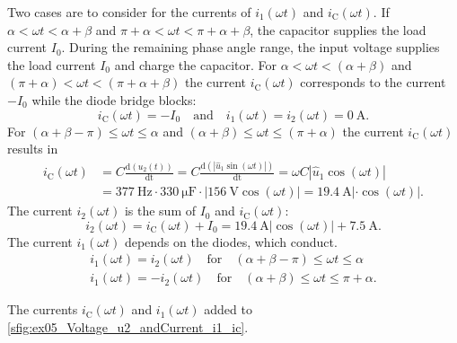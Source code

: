 \begin{solutionblock}
    Two cases are to consider for the currents of $i_\mathrm{1}(\omega t)$ and  $i_\mathrm{C}(\omega t)$. If $\alpha<\omega t<\alpha+\beta$
    and $\pi+\alpha<\omega t<\pi+\alpha+\beta$, the capacitor supplies the load current $I_{\mathrm{0}}$.
    During the remaining phase angle range, the input voltage supplies the load current $I_{\mathrm{0}}$ and charge the capacitor.
    For $\alpha<\omega t<(\alpha+\beta)$ and $(\pi+\alpha)<\omega t<(\pi+\alpha+\beta)$ the current $i_\mathrm{C}(\omega t)$ 
    corresponds to the current $-I_{\mathrm{0}}$ while the diode bridge blocks:
    \begin{equation} 
        i_\mathrm{C}(\omega t)=-I_{\mathrm{0}} \quad \text{and} \quad i_\mathrm{1}(\omega t)= i_\mathrm{2}(\omega t)= \SI{0}{\ampere}.
    \end{equation}
    For $(\alpha+\beta-\pi)\leq\omega t\leq\alpha$ and $(\alpha+\beta)\leq\omega t\leq(\pi+\alpha)$ the current $i_\mathrm{C}(\omega t)$ results in
    \begin{equation}
        \begin{aligned}
            i_\mathrm{C}(\omega t)&=C\frac{\mathrm{d}(u_\mathrm{2}(t))}{\mathrm{dt}}=C\frac{\mathrm{d}(\left| \hat{u}_\mathrm{1}\sin(\omega t)\right|)}{\mathrm{dt}}
            = \omega C \left|\hat{u}_\mathrm{1}\cos(\omega t)\right|  \\
            &= \SI{377}{\hertz} \cdot \SI{330}{\micro\farad} \cdot  \left|\SI{156}{\volt}\cos(\omega t)\right|
            =\SI{19.4}{\ampere}\left| \cdot \cos(\omega t)\right|.
        \end{aligned}
    \end{equation}
    The current $i_\mathrm{2}(\omega t)$ is the sum of $I_{\mathrm{0}}$ and $i_\mathrm{C}(\omega t)$:
    \begin{equation} 
        i_\mathrm{2}(\omega t)=i_\mathrm{C}(\omega t) + I_{\mathrm{0}}=\SI{19.4}{\ampere}\left|\cos(\omega t)\right| + \SI{7.5}{\ampere}.
    \end{equation}
    The current $i_\mathrm{1}(\omega t)$ depends on the diodes, which conduct.
    \begin{equation}
        \begin{split}
            i_\mathrm{1}(\omega t)=i_\mathrm{2}(\omega t) \quad \text{for} \quad (\alpha+\beta-\pi)\leq\omega t\leq\alpha \\
            i_\mathrm{1}(\omega t)=-i_\mathrm{2}(\omega t) \quad \text{for} \quad (\alpha+\beta)\leq\omega t\leq\pi+\alpha.
        \end{split}
    \end{equation}

    The currents $i_\mathrm{C}(\omega t)$ and $i_\mathrm{1}(\omega t)$ added to \autoref{sfig:ex05_Voltage_u2_andCurrent_i1_ic}.

\end{solutionblock}

